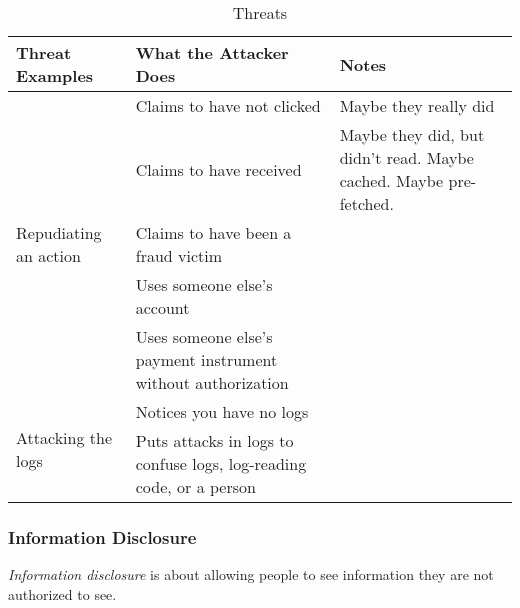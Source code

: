 \begin{table}[h!]
  \centering
  \begin{tabular}{p{5.7cm}p{5.7cm}p{5.7cm}}
    \toprule
    Threat Examples & What the Attacker Does & Notes \\
    \midrule
    \multirow{5}{5.7cm}{Repudiating an action} & Claims to have not clicked & Maybe they really did \\ \cline{2-3}
                                               & Claims to have received & Maybe they did, but didn't read. Maybe cached. Maybe pre-fetched. \\ \cline{2-3}
                                               & Claims to have been a fraud victim & \\ \cline{2-3}
                                               & Uses someone else's account & \\ \cline{2-3}
                                               & Uses someone else's payment instrument without authorization & \\
    \midrule
    \multirow{2}{5.7cm}{Attacking the logs} & Notices you have no logs & \\ \cline{2-3}
                                               & Puts attacks in logs to confuse logs, log-reading code, or a person & \\
    \bottomrule
  \end{tabular}
  \caption{ Threats}
  \label{tab:Repudiation_Threats}
\end{table}

\subsubsection{Information Disclosure}\label{subsubsec:Information_Disclosure}
\begin{definition}\label{def:Information_Disclosure}
  \emph{Information disclosure} is about allowing people to see information they are not authorized to see.
\end{definition}

